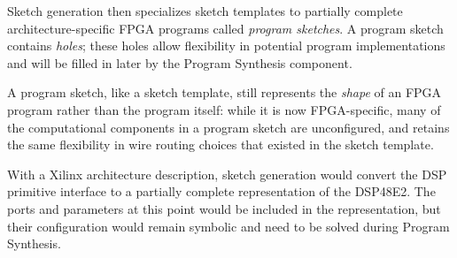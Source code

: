   


Sketch generation then
  specializes
  sketch templates
  to partially complete
  architecture-specific
  FPGA programs called
  \textit{program sketches}. A program sketch
  contains \textit{holes};
these holes allow flexibility
  in potential program implementations
  and will be filled in later by the Program
  Synthesis component.

A program sketch, like a sketch template, still
  represents the \textit{shape} of an FPGA program
  rather than the program itself:
  while it is now FPGA-specific,
  many of the computational
  components in a program
  sketch are unconfigured,
  and retains the
  same flexibility
  in wire routing
  choices that
  existed in the
  sketch template.
  
With a Xilinx architecture description, sketch
  generation would convert the DSP primitive interface
  to a partially complete representation of the DSP48E2.
  The ports and parameters at this point would be included
  in the representation, but their configuration would
  remain symbolic and need to be solved during Program
  Synthesis.
  

